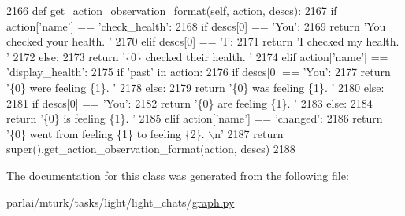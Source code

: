 \begin{DoxyCode}
2166     \textcolor{keyword}{def }get\_action\_observation\_format(self, action, descs):
2167         \textcolor{keywordflow}{if} action[\textcolor{stringliteral}{'name'}] == \textcolor{stringliteral}{'check\_health'}:
2168             \textcolor{keywordflow}{if} descs[0] == \textcolor{stringliteral}{'You'}:
2169                 \textcolor{keywordflow}{return} \textcolor{stringliteral}{'You checked your health. '}
2170             \textcolor{keywordflow}{elif} descs[0] == \textcolor{stringliteral}{'I'}:
2171                 \textcolor{keywordflow}{return} \textcolor{stringliteral}{'I checked my health. '}
2172             \textcolor{keywordflow}{else}:
2173                 \textcolor{keywordflow}{return} \textcolor{stringliteral}{'\{0\} checked their health. '}
2174         \textcolor{keywordflow}{elif} action[\textcolor{stringliteral}{'name'}] == \textcolor{stringliteral}{'display\_health'}:
2175             \textcolor{keywordflow}{if} \textcolor{stringliteral}{'past'} \textcolor{keywordflow}{in} action:
2176                 \textcolor{keywordflow}{if} descs[0] == \textcolor{stringliteral}{'You'}:
2177                     \textcolor{keywordflow}{return} \textcolor{stringliteral}{'\{0\} were feeling \{1\}. '}
2178                 \textcolor{keywordflow}{else}:
2179                     \textcolor{keywordflow}{return} \textcolor{stringliteral}{'\{0\} was feeling \{1\}. '}
2180             \textcolor{keywordflow}{else}:
2181                 \textcolor{keywordflow}{if} descs[0] == \textcolor{stringliteral}{'You'}:
2182                     \textcolor{keywordflow}{return} \textcolor{stringliteral}{'\{0\} are feeling \{1\}. '}
2183                 \textcolor{keywordflow}{else}:
2184                     \textcolor{keywordflow}{return} \textcolor{stringliteral}{'\{0\} is feeling \{1\}. '}
2185         \textcolor{keywordflow}{elif} action[\textcolor{stringliteral}{'name'}] == \textcolor{stringliteral}{'changed'}:
2186             \textcolor{keywordflow}{return} \textcolor{stringliteral}{'\{0\} went from feeling \{1\} to feeling \{2\}. \(\backslash\)n'}
2187         \textcolor{keywordflow}{return} super().get\_action\_observation\_format(action, descs)
2188 
\end{DoxyCode}


The documentation for this class was generated from the following file\+:\begin{DoxyCompactItemize}
\item 
parlai/mturk/tasks/light/light\+\_\+chats/\hyperlink{parlai_2mturk_2tasks_2light_2light__chats_2graph_8py}{graph.\+py}\end{DoxyCompactItemize}
